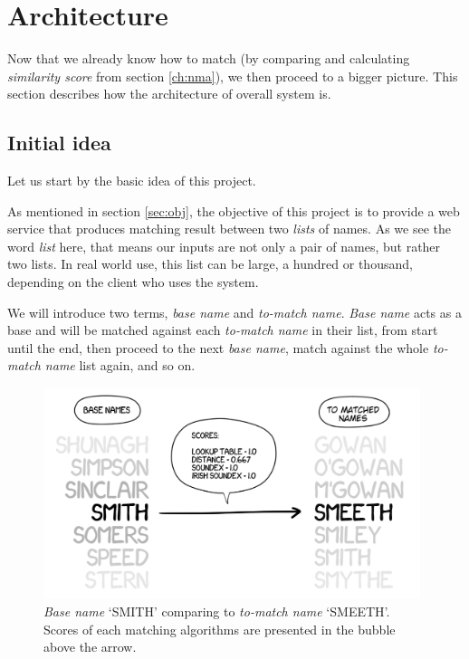 \chapter{Architecture}
\label{ch:architecture}

Now that we already know how to match (by comparing and calculating
\emph{similarity score} from section \ref{ch:nma}), we then proceed
to a bigger picture. This section describes how the architecture
of overall system is.
\section{Initial idea}
\label{sec:initialidea}

Let us start by the basic idea of this project.

As mentioned in section \ref{sec:obj}, the objective of this project is
to provide a web service that produces matching result between two
\emph{lists} of names. As we see the word \emph{list} here, that means
our inputs are not only a pair of names, but rather two lists.
In real world use, this list can be large, a hundred or thousand,
depending on the client who uses the system.

We will introduce two terms, \emph{base name} and \emph{to-match name}.
\emph{Base name} acts as a base and will be matched against each
\emph{to-match name} in their list, from start until the end, then
proceed to the next \emph{base name}, match against the whole
\emph{to-match name} list again, and so on.

\begin{figure}[H]
\centering
\captionsetup{justification=centering}
\includegraphics[width=11cm]{gfx/base_tmn}
\caption[\emph{Base name} `SMITH' comparing to \emph{to-match name} `SMEETH'.]{\emph{Base name}
`SMITH' comparing to \emph{to-match name} `SMEETH'. \\
Scores of each matching algorithms
are presented in the bubble above the arrow.}
\label{fig:base_tmn}
\end{figure}

